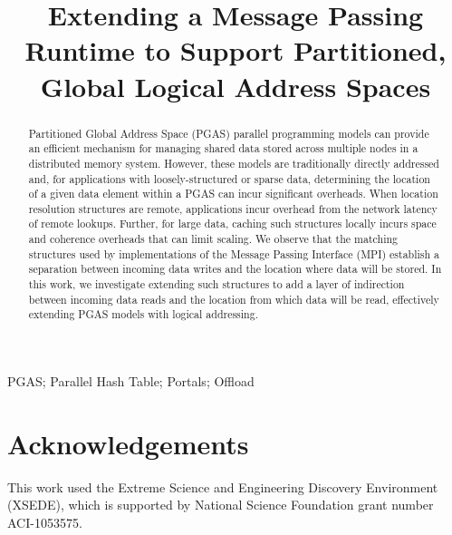 \documentclass[10pt,conference]{IEEEtran}
\begin{document}
\title{Extending a Message Passing Runtime to Support Partitioned, Global Logical Address Spaces}
\author{
\and
{}
}

\maketitle

\begin{abstract}

Partitioned Global Address Space (PGAS) parallel programming models can provide
an efficient mechanism for managing shared data stored across multiple nodes in a
distributed memory system.  However, these models are traditionally directly
addressed and, for applications with loosely-structured or sparse data,
determining the location of a given data element within a PGAS can incur
significant overheads.  When location resolution structures are remote,
applications incur overhead from the network latency of remote lookups.
Further, for large data, caching such structures locally incurs space and
coherence overheads that can limit scaling.
%
We observe that the matching structures used by implementations of the Message
Passing Interface (MPI) establish a separation between incoming data writes and
the location where data will be stored.  In this work, we investigate extending
such structures to add a layer of indirection between incoming data reads
and the location from which data will be read, effectively extending PGAS models
with logical addressing.

\end{abstract}

\begin{IEEEkeywords}
PGAS; Parallel Hash Table; Portals; Offload
\end{IEEEkeywords}







\section*{Acknowledgements}

This work used the Extreme Science and Engineering Discovery Environment
(XSEDE), which is supported by National Science Foundation grant number
ACI-1053575.
\end{document}

